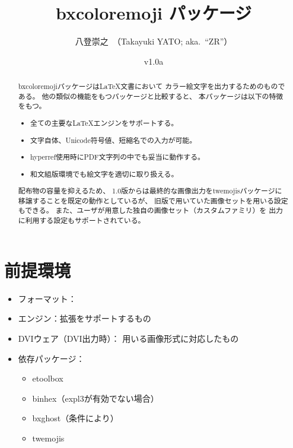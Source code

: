 \documentclass[a4paper]{ltjsarticle}
\newcommand{\PkgVersion}{1.0a}
\newcommand{\PkgDate}{2024/11/18}
\newcommand{\Pkg}[1]{\textsf{#1}}
\newcommand{\Means}{：\quad}
\newcommand{\／}{\mbox{}／\mbox{}}
\begin{document}
\title{\Pkg{bxcoloremoji} パッケージ}
\author{八登崇之\ （Takayuki YATO; aka.~“ZR”）}
\date{v\PkgVersion\quad[\PkgDate]}
\maketitle

\begin{abstract}
\Pkg{bxcoloremoji}パッケージは{\LaTeX}文書において
カラー絵文字を出力するためのものである。
他の類似の機能をもつパッケージと比較すると、
本パッケージは以下の特徴をもつ。
\begin{itemize}
\item 全ての主要な{\LaTeX}エンジンをサポートする。
\item 文字自体、Unicode符号値、短縮名での入力が可能。
\item \Pkg{hyperref}使用時にPDF文字列の中でも妥当に動作する。
\item 和文組版環境でも絵文字を適切に取り扱える。
\end{itemize}

配布物の容量を抑えるため、
1.0版からは最終的な画像出力を\Pkg{twemojis}パッケージに
移譲することを既定の動作としているが、
旧版で用いていた画像セットを用いる設定もできる。
また、ユーザが用意した独自の画像セット（カスタムファミリ）を
出力に利用する設定もサポートされている。
\end{abstract}

\tableofcontents


\section{前提環境}
\label{sec:Prerequisites}

\begin{itemize}
\item フォーマット\Means {\LaTeX}
\item エンジン\Means {\eTeX}拡張をサポートするもの
\item DVIウェア（DVI出力時）\Means
  用いる画像形式に対応したもの
\item 依存パッケージ\Means
  \begin{itemize}
  \item \Pkg{etoolbox}
  \item \Pkg{binhex}（expl3が有効でない場合）
  \item \Pkg{bxghost}（条件により）
  \item \Pkg{twemojis}
  \end{itemize}
\end{itemize}
\end{document}
